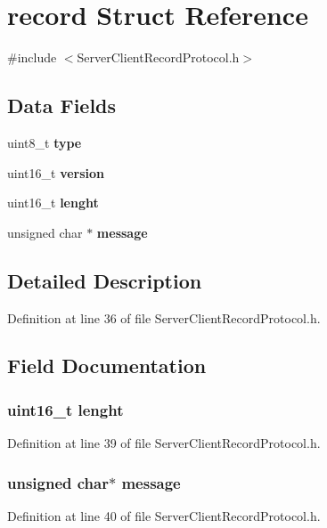 \section{record Struct Reference}
\label{structrecord}


{\ttfamily \#include $<$Server\+Client\+Record\+Protocol.\+h$>$}

\subsection*{Data Fields}
\begin{DoxyCompactItemize}
\item 
uint8\+\_\+t {\bf type}
\item 
uint16\+\_\+t {\bf version}
\item 
uint16\+\_\+t {\bf lenght}
\item 
unsigned char $\ast$ {\bf message}
\end{DoxyCompactItemize}


\subsection{Detailed Description}


Definition at line 36 of file Server\+Client\+Record\+Protocol.\+h.



\subsection{Field Documentation}
\subsubsection[{lenght}]{\setlength{\rightskip}{0pt plus 5cm}uint16\+\_\+t lenght}\label{structrecord_a9780a19b886e6b96fa57c2cdd0f2aa51}


Definition at line 39 of file Server\+Client\+Record\+Protocol.\+h.

\subsubsection[{message}]{\setlength{\rightskip}{0pt plus 5cm}unsigned char$\ast$ message}\label{structrecord_abb13456032cf48eaa794391b6ed937c7}


Definition at line 40 of file Server\+Client\+Record\+Protocol.\+h.

